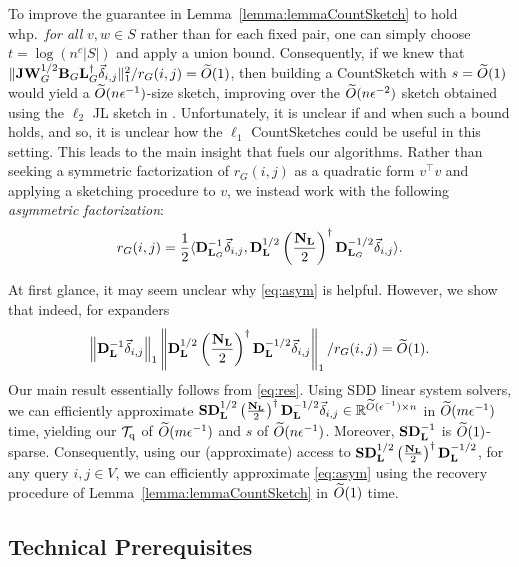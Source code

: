 To improve the guarantee in Lemma~\ref{lemma:lemmaCountSketch} to hold whp.\ \emph{for all} $v, w \in S$ rather than for each fixed pair, one can simply choose $t = \log(n^{c}|S|)$ and apply a union bound. Consequently, if we knew that $\Vert \mathbf{J}\mathbf{W}_G^{1/2}\mathbf{B}_G\mathbf{L}_{G}^\dagger \vec{\delta}_{i,j}\Vert_1^2/ r_G(i,j) = \widetilde{O}( {1} )$, then building a CountSketch with $s = \widetilde{O}( {1} )$ would yield a $\widetilde{O}( {n\epsilon^{-1}} )$-size sketch, improving over the $\widetilde{O}( {n\epsilon^{-2}} )$ sketch obtained using the $\ell_2$ JL sketch in \cite{spielman2009graph}. Unfortunately, it is unclear if and when such a bound holds, and so, it is unclear how the $\ell_1$ CountSketches could be useful in this setting. This leads to the main insight that fuels our algorithms. Rather than seeking a symmetric factorization of $r_G(i, j)$ as a quadratic form $v^\top v$ and applying a sketching procedure to $v$, we instead work with the following \emph{asymmetric factorization}:
\begin{align}\label{eq:asym}
    r_G(i,j) = \frac{1}{2}\langle {\mathbf{D}}_{\mathbf{L}_{G}}^{-1} \vec{\delta}_{i,j}, {\mathbf{D}}_{\mathbf{L}}^{1/2} \left(\frac{\mathbf{N}_{\mathbf{L}}} {2}\right)^\dagger {\mathbf{D}}_{\mathbf{L}_{G}}^{-1/2} \vec{\delta}_{i,j} \rangle.
\end{align}

At first glance, it may seem unclear why \eqref{eq:asym} is helpful. However, we show that indeed, for expanders 
\begin{align}\label{eq:res}
    \left\| {\mathbf{D}}_{\mathbf{L}}^{-1} \vec{\delta}_{i,j}\right\|_1 \left\|{\mathbf{D}}_{\mathbf{L}}^{1/2} \left(\frac{\mathbf{N}_{\mathbf{L}}} {2}\right)^\dagger {\mathbf{D}}_{\mathbf{L}}^{-1/2} \vec{\delta}_{i,j} \right\|_1 /r_G(i,j) = \widetilde{O}( {1} ). 
\end{align}
Our main result essentially follows from \eqref{eq:res}. Using SDD linear system solvers, we can efficiently approximate $\mathbf{S} {\mathbf{D}}_{\mathbf{L}}^{1/2} \left(\frac{\mathbf{N}_{\mathbf{L}}} {2}\right)^\dagger {\mathbf{D}}_{\mathbf{L}}^{-1/2} \vec{\delta}_{i,j}  \in \mathbb{R}^{\widetilde{O}( {\epsilon^{-1}} ) \times n}$ in $\widetilde{O}( {m\epsilon^{-1}} )$ time, yielding our $\mathcal{T}_{\mathrm{q}}$ of $\widetilde{O}( {m\epsilon^{-1}} )$ and $s$ of $\widetilde{O}( {n\epsilon^{-1}} )$. Moreover, $\mathbf{S} {\mathbf{D}}_{\mathbf{L}}^{-1}$ is $\widetilde{O}( {1} )$-sparse. Consequently, using our (approximate) access to $\mathbf{S} {\mathbf{D}}_{\mathbf{L}}^{1/2} \left(\frac{\mathbf{N}_{\mathbf{L}}} {2}\right)^\dagger {\mathbf{D}}_{\mathbf{L}}^{-1/2}$, for any query $i, j \in V$, we can efficiently approximate \eqref{eq:asym} using the recovery procedure of Lemma~\ref{lemma:lemmaCountSketch} in $\widetilde{O}( {1} )$ time. 

\subsection{Technical Prerequisites}\label{subsection:technical}

